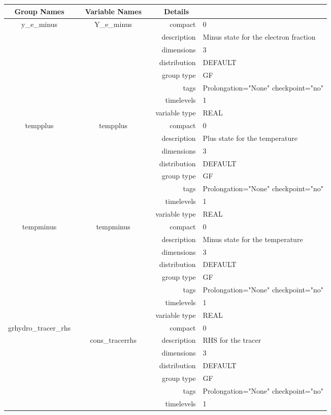 \begin{tabular*}{150mm}{|c|c@{\extracolsep{\fill}}|rl|} \hline 
~ {\bf Group Names} ~ & ~ {\bf Variable Names} ~  &{\bf Details} ~ & ~ \\ 
\hline 
y\_e\_minus & Y\_e\_minus & compact & 0 \\ 
 &  & description & Minus state for the electron fraction \\ 
 &  & dimensions & 3 \\ 
 &  & distribution & DEFAULT \\ 
 &  & group type & GF \\ 
 &  & tags & Prolongation="None" checkpoint="no" \\ 
 &  & timelevels & 1 \\ 
 &  & variable type & REAL \\ 
\hline 
tempplus & tempplus & compact & 0 \\ 
 &  & description & Plus state  for the temperature \\ 
 &  & dimensions & 3 \\ 
 &  & distribution & DEFAULT \\ 
 &  & group type & GF \\ 
 &  & tags & Prolongation="None" checkpoint="no" \\ 
 &  & timelevels & 1 \\ 
 &  & variable type & REAL \\ 
\hline 
tempminus & tempminus & compact & 0 \\ 
 &  & description & Minus state for the temperature \\ 
 &  & dimensions & 3 \\ 
 &  & distribution & DEFAULT \\ 
 &  & group type & GF \\ 
 &  & tags & Prolongation="None" checkpoint="no" \\ 
 &  & timelevels & 1 \\ 
 &  & variable type & REAL \\ 
\hline 
grhydro\_tracer\_rhs &  & compact & 0 \\ 
 & cons\_tracerrhs & description & RHS for the tracer \\ 
 &  & dimensions & 3 \\ 
 &  & distribution & DEFAULT \\ 
 &  & group type & GF \\ 
 &  & tags & Prolongation="None" checkpoint="no" \\ 
 &  & timelevels & 1 \\ 

\end{tabular*}
